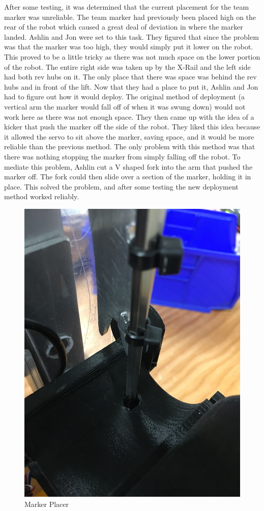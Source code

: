 \documentclass{article}
\begin{document}
After some testing, it was determined that the current placement for the team marker was unreliable. The team marker had previously been placed high on the rear of the robot which caused a great deal of deviation in where the marker landed. Ashlin and Jon were set to this task. They figured that since the problem was that the marker was too high, they would simply put it lower on the robot. This proved to be a little tricky as there was not much space on the lower portion of the robot. The entire right side was taken up by the X-Rail and the left side had both rev hubs on it. The only place that there was space was behind the rev hubs and in front of the lift. Now that they had a place to put it, Ashlin and Jon had to figure out how it would deploy. The original method of deployment (a vertical arm the marker would fall off of when it was swung down) would not work here as there was not enough space. They then came up with the idea of a kicker that push the marker off the side of the robot. They liked this idea because it allowed the servo to sit above the marker, saving space, and it would be more reliable than the previous method. The only problem with this method was that there was nothing stopping the marker from simply falling off the robot. To mediate this problem, Ashlin cut a V shaped fork into the arm that pushed the marker off. The fork could then slide over a section of the marker, holding it in place. This solved the problem, and after some testing the new deployment method worked reliably.

\begin{figure}
    \centering
    \includegraphics[width=.6 \textwidth]{20_01-14/images/markerplacer.JPG}
    \caption{Marker Placer}
    \label{fig:markerplacer}
\end{figure}
\end{document}
